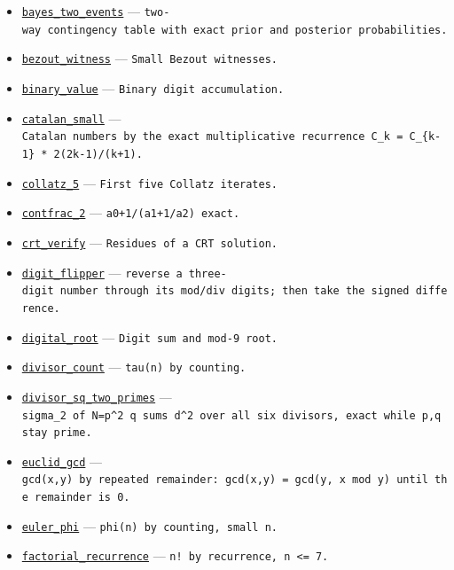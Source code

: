 \documentclass[
  10pt,
]{article}
\providecommand{\tightlist}{%
  \setlength{\itemsep}{0pt}\setlength{\parskip}{0pt}}
\begin{document}
\begin{itemize}
\tightlist
\item
  \href{../generation_1/I3/algos_i3.py}{\texttt{bayes\_two\_events}} ---
  \texttt{two-way\ contingency\ table\ with\ exact\ prior\ and\ posterior\ probabilities.}
\item
  \href{../generation_1/I1/algos_gen1_big.py}{\texttt{bezout\_witness}}
  --- \texttt{Small\ Bezout\ witnesses.}
\item
  \href{../generation_1/I1/algos_gen1_big.py}{\texttt{binary\_value}}
  --- \texttt{Binary\ digit\ accumulation.}
\item
  \href{../generation_1/I3/algos_i3.py}{\texttt{catalan\_small}} ---
  \texttt{Catalan\ numbers\ by\ the\ exact\ multiplicative\ recurrence\ C\_k\ =\ C\_\{k-1\}\ *\ 2(2k-1)/(k+1).}
\item
  \href{../generation_1/I1/algos_gen1_big.py}{\texttt{collatz\_5}} ---
  \texttt{First\ five\ Collatz\ iterates.}
\item
  \href{../generation_1/I1/algos_gen1_big.py}{\texttt{contfrac\_2}} ---
  \texttt{a0+1/(a1+1/a2)\ exact.}
\item
  \href{../generation_1/I1/algos_gen1_big.py}{\texttt{crt\_verify}} ---
  \texttt{Residues\ of\ a\ CRT\ solution.}
\item
  \href{../generation_1/I3/algos_i3.py}{\texttt{digit\_flipper}} ---
  \texttt{reverse\ a\ three-digit\ number\ through\ its\ mod/div\ digits;\ then\ take\ the\ signed\ difference.}
\item
  \href{../generation_1/I1/algos_gen1_big.py}{\texttt{digital\_root}}
  --- \texttt{Digit\ sum\ and\ mod-9\ root.}
\item
  \href{../generation_1/I1/algos_gen1_big.py}{\texttt{divisor\_count}}
  --- \texttt{tau(n)\ by\ counting.}
\item
  \href{../generation_1/I3/algos_i3.py}{\texttt{divisor\_sq\_two\_primes}}
  ---
  \texttt{sigma\_2\ of\ N=p\^{}2\ q\ sums\ d\^{}2\ over\ all\ six\ divisors,\ exact\ while\ p,q\ stay\ prime.}
\item
  \href{../tools/prm/algos.py}{\texttt{euclid\_gcd}} ---
  \texttt{gcd(x,y)\ by\ repeated\ remainder:\ gcd(x,y)\ =\ gcd(y,\ x\ mod\ y)\ until\ the\ remainder\ is\ 0.}
\item
  \href{../generation_1/I1/algos_gen1_big.py}{\texttt{euler\_phi}} ---
  \texttt{phi(n)\ by\ counting,\ small\ n.}
\item
  \href{../generation_1/I1/algos_gen1_ext.py}{\texttt{factorial\_recurrence}}
  --- \texttt{n!\ by\ recurrence,\ n\ \textless{}=\ 7.}

\end{itemize}
\end{document}
